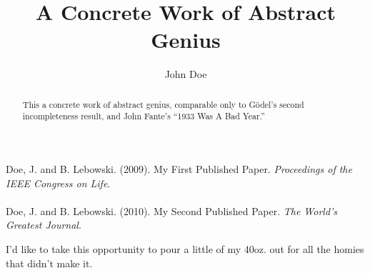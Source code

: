 \documentclass{report}
\title{A Concrete Work of Abstract Genius}
\author{John Doe}
\begin{document}
\maketitle
\makeacceptance

\begin{abstract}
This a concrete work of abstract genius, comparable only to G\"odel's second
incompleteness result, and John Fante's ``1933 Was A Bad Year.''
\end{abstract}

\begin{citationspage}
\citationheadingpublished
\noindent Doe, J. and B. Lebowski. (2009). My First Published Paper. {\it Proceedings of the IEEE Congress on Life}.
\\ \\
\noindent Doe, J. and B. Lebowski. (2010). My Second Published Paper. {\it The World's Greatest Journal}.
\end{citationspage}


\begin{acknowledgements}  %
I'd like to take this opportunity to pour a little of my 40oz. out for all
the homies that didn't make it.
\end{acknowledgements}

\tableofcontents
\listoffigures
\listoftables

\mainmatter
\sloppy










\end{document}
